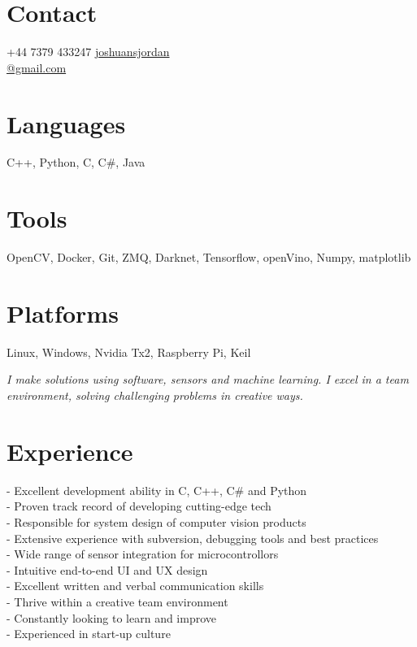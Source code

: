 \documentclass[print]{friggeri-cv} %
\begin{document}

\begin{aside} %
\section{Contact}
+44 7379 433247
\href{mailto:joshuansjordan@gmail.com}{joshuansjordan\\@gmail.com}
\section{Languages}
C++, Python, C, C\#, Java
\section{Tools}
OpenCV, Docker, Git, ZMQ, Darknet, Tensorflow, openVino, Numpy, matplotlib
\section{Platforms}
Linux, Windows, Nvidia Tx2, Raspberry Pi, Keil
\end{aside}

\emph{I make solutions using software, sensors and machine learning. I excel in a team environment, solving challenging problems in creative ways.}

\section{Experience}
- Excellent development ability in C, C++, C\# and Python\\
- Proven track record of developing cutting-edge tech\\
- Responsible for system design of computer vision products\\
- Extensive experience with subversion, debugging tools and best practices\\
- Wide range of sensor integration for microcontrollors\\
- Intuitive end-to-end UI and UX design\\
- Excellent written and verbal communication skills\\
- Thrive within a creative team environment\\
- Constantly looking to learn and improve\\
- Experienced in start-up culture\\
\end{document}
